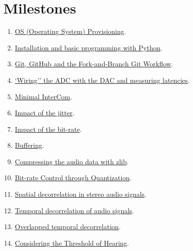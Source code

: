 \section{Milestones}
\begin{enumerate}
\item \href{https://tecnologias-multimedia.github.io/study_guide/01-provisioning/}{OS (Operating System) Provisioning}.
\item \href{https://tecnologias-multimedia.github.io/study_guide/02-python/}{Installation and basic programming with Python}.
\item \href{https://tecnologias-multimedia.github.io/study_guide/03-git/}{Git, GitHub and the Fork-and-Branch Git Workflow}.
\item \href{https://tecnologias-multimedia.github.io/study_guide/04-wiring/}{`Wiring'' the ADC with the DAC and measuring latencies}.
\item \href{https://tecnologias-multimedia.github.io/study_guide/05-minimal/}{Minimal InterCom}.
\item \href{https://tecnologias-multimedia.github.io/study_guide/06-jitter_impact/}{Impact of the jitter}.
\item \href{https://tecnologias-multimedia.github.io/study_guide/07-bit-rate_impact/}{Impact of the bit-rate}.
\item \href{https://tecnologias-multimedia.github.io/study_guide/08-buffering/}{Buffering}.
\item \href{https://tecnologias-multimedia.github.io/study_guide/09-compress/}{Compressing the audio data with zlib}.
\item \href{https://tecnologias-multimedia.github.io/study_guide/10-quantization/}{Bit-rate Control through Quantization}.
\item \href{https://tecnologias-multimedia.github.io/study_guide/11-stereo_coding/}{Spatial decorrelation in stereo audio signals}.
\item \href{https://tecnologias-multimedia.github.io/study_guide/12-temporal_decorrelation/}{Temporal decorrelation of audio signals}.
\item \href{https://tecnologias-multimedia.github.io/study_guide/13-overlapped_temporal_decorrelation/}{Overlapped temporal decorrelation}.
\item \href{https://tecnologias-multimedia.github.io/study_guide/14-threshold/}{Considering the Threshold of Hearing}.
\end{enumerate}


